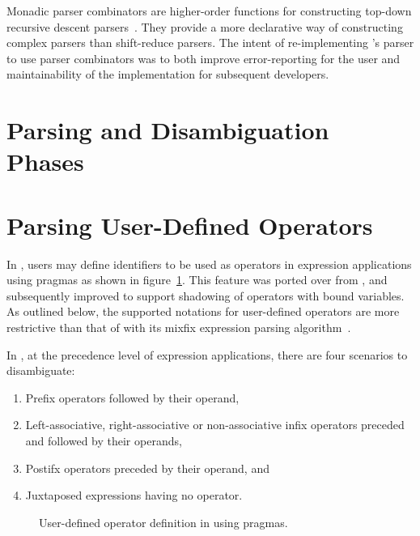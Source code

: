 
Monadic parser combinators are higher-order functions for constructing top-down recursive descent parsers~\cite{Burge1975-BURRPT, hutton1996monadic, leijen2001parsec, generalparsercombs}.
They provide a more declarative way of constructing complex parsers than shift-reduce parsers.
The intent of re-implementing \Beluga's parser to use parser combinators was to both improve error-reporting for the user and maintainability of the implementation for subsequent developers.




\section{\Beluga Parsing and Disambiguation Phases}

\section{Parsing User-Defined Operators}

In \Beluga, users may define identifiers to be used as operators in expression applications using pragmas as shown in figure~\ref{figure:operator-pragmas}.
This feature was ported over from \Twelf, and subsequently improved to support shadowing of operators with bound variables.
As outlined below, the supported notations for user-defined operators are more restrictive than that of \Agda with its mixfix expression parsing algorithm~\cite{danielsson2008parsing}.

In \Beluga, at the precedence level of expression applications, there are four scenarios to disambiguate:
\begin{enumerate}
\item Prefix operators followed by their operand,
\item Left-associative, right-associative or non-associative infix operators preceded and followed by their operands,
\item Postifx operators preceded by their operand, and
\item Juxtaposed expressions having no operator.
\end{enumerate}

\begin{figure}[!htb]
\label{figure:operator-pragmas}
\caption{User-defined operator definition in \Beluga using pragmas.}
\end{figure}


